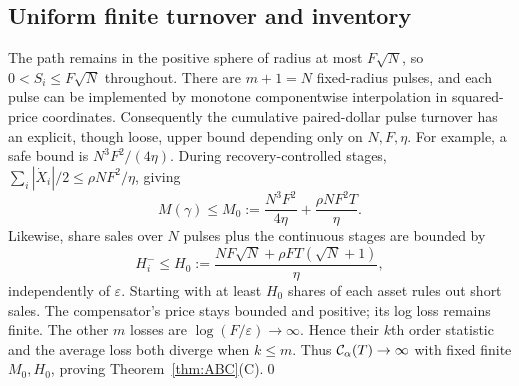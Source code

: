 \documentclass[review,hidelinks,onefignum,onetabnum]{siamonline250211}
\begin{document}
\subsection{Uniform finite turnover and inventory}
The path remains in the positive sphere of radius at most $F\sqrt N$, so $0<S_i\le F\sqrt N$ throughout. There are $m+1=N$ fixed-radius pulses, and each pulse can be implemented by monotone componentwise interpolation in squared-price coordinates. Consequently the cumulative paired-dollar pulse turnover has an explicit, though loose, upper bound depending only on $N,F,\eta$. For example, a safe bound is $N^3F^2/(4\eta)$. During recovery-controlled stages, $\sum_i|\dot X_i|/2\le \rho NF^2/\eta$, giving
\begin{equation}\label{eq:uniformM}
M(\gamma)\le M_0:=\frac{N^3F^2}{4\eta}+\frac{\rho NF^2T}{\eta}.
\end{equation}
Likewise, share sales over $N$ pulses plus the continuous stages are bounded by
\begin{equation}\label{eq:uniformH}
H_i^-\le H_0:=\frac{NF\sqrt N+\rho FT(\sqrt N+1)}\eta,
\end{equation}
independently of $\varepsilon$. Starting with at least $H_0$ shares of each asset rules out short sales. The compensator's price stays bounded and positive; its log loss remains finite. The other $m$ losses are $\log(F/\varepsilon)\to\infty$. Hence their $k$th order statistic and the average loss both diverge when $k\le m$. Thus $\mathcal{C}_\alpha(T)\to\infty$ with fixed finite $M_0,H_0$, proving Theorem~\ref{thm:ABC}(C).\qed
\end{document}

